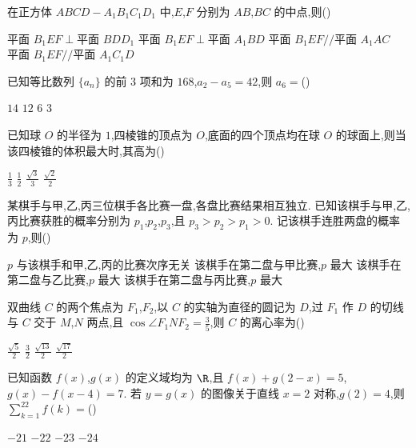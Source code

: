 \begin{problem}
在正方体 \(ABCD-A_1B_1C_1D_1\) 中,\(E\),\(F\) 分别为 \(AB\),\(BC\) 的中点,则(\quad)

\choices
    {\(\text{平面 }B_1EF\perp \text{平面 }BDD_1\)}
    {\(\text{平面 }B_1EF\perp \text{平面 }A_1BD\)}
    {\(\text{平面 }B_1EF // \text{平面 }A_1AC\)}
    {\(\text{平面 }B_1EF // \text{平面 }A_1C_1D\)}
\end{problem}

\begin{problem}
已知等比数列 \(\{a_n\}\) 的前 \(3\) 项和为 \(168\),\(a_2-a_5=42\),则 \(a_6=\)(\quad)

\choices
    {\(14\)}
    {\(12\)}
    {\(6\)}
    {\(3\)}
\end{problem}

\begin{problem}
已知球 \(O\) 的半径为 \(1\),四棱锥的顶点为 \(O\),底面的四个顶点均在球 \(O\) 的球面上,则当该四棱锥的体积最大时,其高为(\quad)

\choices
    {\(\frac{1}{3}\)}
    {\(\frac{1}{2}\)}
    {\(\frac{\sqrt{3}}{3}\)}
    {\(\frac{\sqrt{2}}{2}\)}
\end{problem}

\begin{problem}
某棋手与甲,乙,丙三位棋手各比赛一盘,各盘比赛结果相互独立. 已知该棋手与甲,乙,丙比赛获胜的概率分别为 \(p_1\),\(p_2\),\(p_3\),且 \(p_3>p_2>p_1>0\). 记该棋手连胜两盘的概率为 \(p\),则(\quad)

\choices
    {\(p\) 与该棋手和甲,乙,丙的比赛次序无关}
    {该棋手在第二盘与甲比赛,\(p\) 最大}
    {该棋手在第二盘与乙比赛,\(p\) 最大}
    {该棋手在第二盘与丙比赛,\(p\) 最大}
\end{problem}

\begin{problem}
双曲线 \(C\) 的两个焦点为 \(F_1\),\(F_2\),以 \(C\) 的实轴为直径的圆记为 \(D\),过 \(F_1\) 作 \(D\) 的切线与 \(C\) 交于 \(M\),\(N\) 两点,且 \(\cos \angle F_1NF_2=\frac{3}{5}\),则 \(C\) 的离心率为(\quad)

\choices
    {\(\frac{\sqrt{5}}{2}\)}
    {\(\frac{3}{2}\)}
    {\(\frac{\sqrt{13}}{2}\)}
    {\(\frac{\sqrt{17}}{2}\)}
\end{problem}

\begin{problem}
已知函数 \(f(x)\),\(g(x)\) 的定义域均为 \(\R\),且 \(f(x)+g(2-x)=5\),\(g(x)-f(x-4)=7\). 若 \(y=g(x)\) 的图像关于直线 \(x=2\) 对称,\(g(2)=4\),则 \(\sum_{k=1}^{22}f(k)=\)(\quad)

\choices
    {\(-21\)}
    {\(-22\)}
    {\(-23\)}
    {\(-24\)}
\end{problem}

